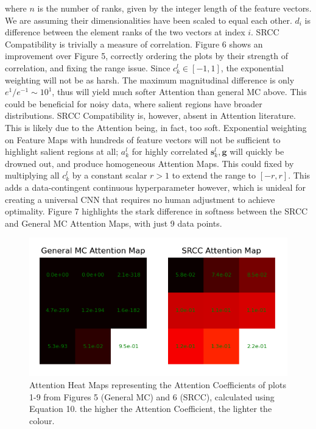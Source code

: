 \documentclass[11pt]{article}
\begin{document}
where $n$ is the number of ranks, given by the integer length of the feature vectors. We are assuming their dimensionalities have been scaled to equal each other. $d_{i}$ is difference between the element ranks of the two vectors at index $i$. SRCC Compatibility is trivially a measure of correlation. Figure 6 shows an improvement over Figure 5, correctly ordering the plots by their strength of correlation, and fixing the range issue. Since $c^{l}_{k} \in [-1,1]$, the exponential weighting will not be as harsh. The maximum magnitudinal difference is only $e^1/e^{-1} \sim 10^1$, thus will yield much softer Attention than general MC above. This could be beneficial for noisy data, where salient regions have broader distributions. SRCC Compatibility is, however, absent in Attention literature. This is likely due to the Attention being, in fact, too soft. Exponential weighting on Feature Maps with hundreds of feature vectors will not be sufficient to highlight salient regions at all; $a^{l}_{k}$ for highly correlated $\bm{s}^{l}_{k}, \bm{g}$ will quickly be drowned out, and produce homogeneous Attention Maps. This could fixed by multiplying all $c^{l}_{k}$ by a constant scalar $r>1$ to extend the range to $[-r,r]$. This adds a data-contingent continuous hyperparameter however, which is unideal for creating a universal CNN that requires no human adjustment to achieve optimality. Figure 7 highlights the stark difference in softness between the SRCC and General MC Attention Maps, with just 9 data points.

\begin{figure}[htp]
    \centering
    \includegraphics[width=12cm]{figures/attentionmap.png}
    \caption{Attention Heat Maps representing the Attention Coefficients of plots 1-9 from Figures 5 (General MC) and 6 (SRCC), calculated using Equation 10. the higher the Attention Coefficient, the lighter the colour.}
 \end{figure}
\vspace{-0.5cm}
\end{document}

